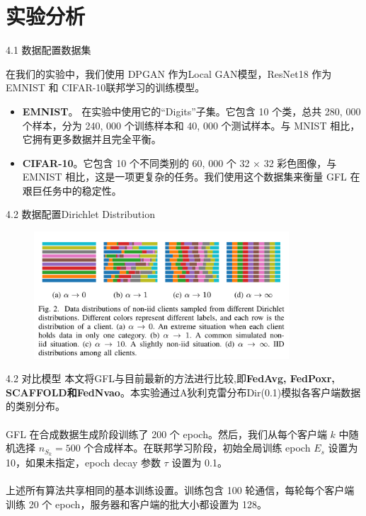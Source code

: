 \documentclass{sintefbeamer}
\theoremstyle{definition}
\begin{document}
\section{实验分析}

\begin{frame}{4.1 数据配置}{数据集}

在我们的实验中，我们使用 DPGAN 作为Local GAN模型，ResNet18 作为 EMNIST 和 CIFAR-10联邦学习的训练模型。

	\begin{itemize}
\item[1)] \textbf{EMNIST}。 在实验中使用它的“Digits”子集。它包含 10 个类，总共 280, 000 个样本，分为 240, 000 个训练样本和 40, 000 个测试样本。与 MNIST 相比，它拥有更多数据并且完全平衡。
\item[2)] \textbf{CIFAR-10}。它包含 10 个不同类别的 60, 000 个 32 × 32 彩色图像，与 EMNIST 相比，这是一项更复杂的任务。我们使用这个数据集来衡量 GFL 在艰巨任务中的稳定性。
\end{itemize}
\end{frame}

\begin{frame}{4.2 数据配置}{Dirichlet Distribution}
\begin{figure}[ht]
\centering
\includegraphics[width=0.85\textwidth]{images/dir}
\end{figure}
\end{frame}


\begin{frame}{4.2 对比模型}
本文将GFL与目前最新的方法进行比较,即\textbf{FedAvg, FedPoxr, SCAFFOLD和FedNvao}。本实验通过A狄利克雷分布Dir(0.1)模拟各客户端数据的类别分布。
	\\ \hspace*{\fill} \\
GFL 在合成数据生成阶段训练了 200 个 epoch。然后，我们从每个客户端 $k$ 中随机选择 $n_{S_k}=500$  个合成样本。在联邦学习阶段，初始全局训练 epoch $E_s$ 设置为 10，如果未指定，epoch decay 参数 $\tau$ 设置为 0.1。
	\\ \hspace*{\fill} \\
上述所有算法共享相同的基本训练设置。训练包含 100 轮通信，每轮每个客户端训练 20 个 epoch，服务器和客户端的批大小都设置为 128。
\end{frame}
\end{document}
